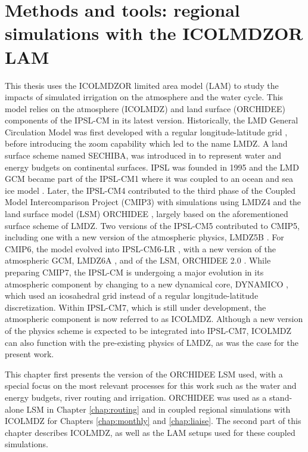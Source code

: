 \chapter{Methods and tools: regional simulations with the ICOLMDZOR LAM}
\label{chap:methods}
\minitoc
\pagebreak

This thesis uses the ICOLMDZOR limited area model (LAM) to study the impacts of simulated irrigation on the atmosphere and the water cycle. This model relies on the atmosphere (ICOLMDZ) and land surface (ORCHIDEE) components of the IPSL-CM in its latest version. 
Historically, the LMD General Circulation Model was first developed with a regular longitude-latitude grid \citep{sadourny_laval_1984}, before introducing the zoom capability \citep{li_ensemble_1999} which led to the name LMDZ. 
A land surface scheme named SECHIBA, was introduced in \citet{ducoudre_sechiba_1993} to represent water and energy budgets on continental surfaces. 
IPSL was founded in 1995 and the LMD GCM became part of the IPSL-CM1 where it was coupled to an ocean and sea ice model \citep{braconnot_adjustment_1997}.
Later, the IPSL-CM4 contributed to the third phase of the Coupled Model Intercomparison Project (CMIP3) with simulations using LMDZ4 \citep{hourdin_lmdz4_2006} and the land surface model (LSM) ORCHIDEE \citep{krinner_dynamic_2005}, largely based on the aforementioned surface scheme of LMDZ.
Two versions of the IPSL-CM5 contributed to CMIP5, including one with a new version of the atmospheric physics, LMDZ5B \citep{hourdin_lmdz5b_2013}.
For CMIP6, the model evolved into IPSL-CM6-LR \citep{boucher_presentation_2020}, with a new version of the atmospheric GCM, LMDZ6A \citep{hourdin_lmdz6a_2020}, and of the LSM, ORCHIDEE 2.0 \citep{cheruy_improved_2020}. 
While preparing CMIP7, the IPSL-CM is undergoing a major evolution in its atmospheric component by changing to a new dynamical core, DYNAMICO \citep{dubos_dynamico-10_2015}, which used an icosahedral grid instead of a regular longitude-latitude discretization. Within IPSL-CM7, which is still under development, the atmospheric component is now referred to as ICOLMDZ. Although a new version of the physics scheme is expected to be integrated into IPSL-CM7, ICOLMDZ can also function with the pre-existing physics of LMDZ, as was the case for the present work.

This chapter first presents the version of the ORCHIDEE LSM used, with a special focus on the most relevant processes for this work such as the water and energy budgets, river routing and irrigation. ORCHIDEE was used as a stand-alone LSM in Chapter \ref{chap:routing} and in coupled regional simulations with ICOLMDZ for Chapters \ref{chap:monthly} and \ref{chap:liaise}. The second part of this chapter describes ICOLMDZ, as well as the LAM setups used for these coupled simulations.

